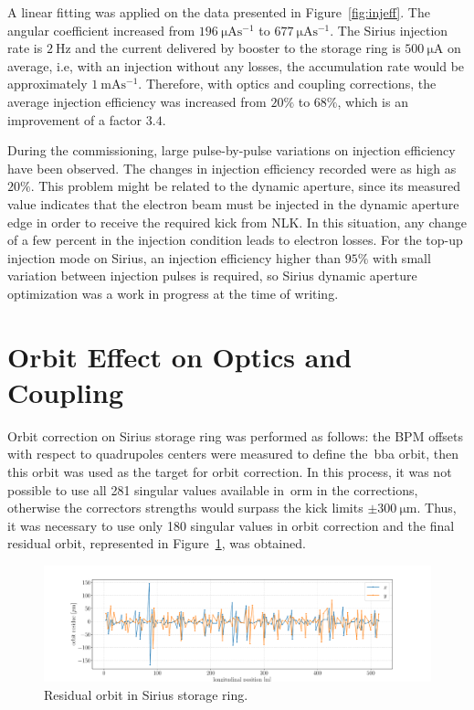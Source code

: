 A linear fitting was applied on the data presented in Figure~\ref{fig:injeff}. The angular coefficient increased from $\SI{196}{\micro\ampere\second^{-1}}$ to $\SI{677}{\micro\ampere\second^{-1}}$. The Sirius injection rate is $\SI{2}{\hertz}$ and the current delivered by booster to the storage ring is $\SI{500}{\micro\ampere}$ on average, i.e, with an injection without any losses, the accumulation rate would be approximately $\SI{1}{\milli\ampere\second^{-1}}$. Therefore, with optics and coupling corrections, the average injection efficiency was increased from $20\%$ to $68\%$, which is an improvement of a factor $3.4$.

During the commissioning, large pulse-by-pulse variations on injection efficiency have been observed. The changes in injection efficiency recorded were as high as $20\%$. This problem might be related to the dynamic aperture, since its measured value indicates that the electron beam must be injected in the dynamic aperture edge in order to receive the required kick from NLK. In this situation, any change of a few percent in the injection condition leads to electron losses. For the top-up injection mode on Sirius, an injection efficiency higher than $95\%$ with small variation between injection pulses is required, so Sirius dynamic aperture optimization was a work in progress at the time of writing. 

\section{Orbit Effect on Optics and Coupling}\label{sec:orbit_effect}
Orbit correction on Sirius storage ring was performed as follows: the BPM offsets with respect to quadrupoles centers were measured to define the~\gls{bba} orbit, then this orbit was used as the target for orbit correction. In this process, it was not possible to use all 281 singular values available in~\gls{orm} in the corrections, otherwise the correctors strengths would surpass the kick limits $\pm \SI{300}{\micro\meter}$. Thus, it was necessary to use only 180 singular values in orbit correction and the final residual orbit, represented in Figure~\ref{fig:orbit_residue}, was obtained.
\begin{figure}[h!]
\centering
\includegraphics[width=1.0\textwidth]{figures/orbit_residue.pdf}
\caption{Residual orbit in Sirius storage ring.}
\label{fig:orbit_residue}
\end{figure}

